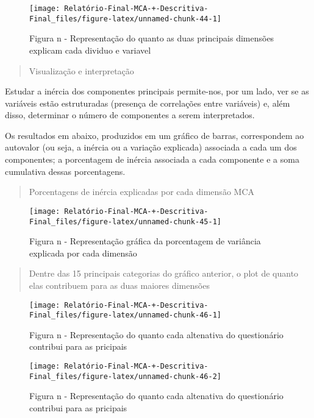 \documentclass[
]{article}
\begin{document}
\begin{figure}

{\centering \texttt{[image: Relatório-Final-MCA-+-Descritiva-Final\_files/figure-latex/unnamed-chunk-44-1]} 

}

\caption{Figura n - Representação do quanto as duas principais dimensões explicam cada dividuo e variavel}\label{fig:unnamed-chunk-44}
\end{figure}

\begin{quote}
Visualização e interpretação
\end{quote}

Estudar a inércia dos componentes principais permite-nos, por um lado,
ver se as variáveis estão estruturadas (presença de correlações entre
variáveis) e, além disso, determinar o número de componentes a serem
interpretados.

Os resultados em abaixo, produzidos em um gráfico de barras,
correspondem ao autovalor (ou seja, a inércia ou a variação explicada)
associada a cada um dos componentes; a porcentagem de inércia associada
a cada componente e a soma cumulativa dessas porcentagens.

\begin{quote}
Porcentagens de inércia explicadas por cada dimensão MCA
\end{quote}

\begin{figure}

{\centering \texttt{[image: Relatório-Final-MCA-+-Descritiva-Final\_files/figure-latex/unnamed-chunk-45-1]} 

}

\caption{Figura n - Representação gráfica da porcentagem de variância explicada por cada dimensão}\label{fig:unnamed-chunk-45}
\end{figure}

\begin{quote}
Dentre das 15 principais categorias do gráfico anterior, o plot de
quanto elas contribuem para as duas maiores dimensões
\end{quote}

\begin{figure}

{\centering \texttt{[image: Relatório-Final-MCA-+-Descritiva-Final\_files/figure-latex/unnamed-chunk-46-1]} 

}

\caption{Figura n - Representação do quanto cada altenativa do questionário contribui para as pricipais}\label{fig:unnamed-chunk-46-1}
\end{figure}
\begin{figure}

{\centering \texttt{[image: Relatório-Final-MCA-+-Descritiva-Final\_files/figure-latex/unnamed-chunk-46-2]} 

}

\caption{Figura n - Representação do quanto cada altenativa do questionário contribui para as pricipais}\label{fig:unnamed-chunk-46-2}
\end{figure}
\end{document}

